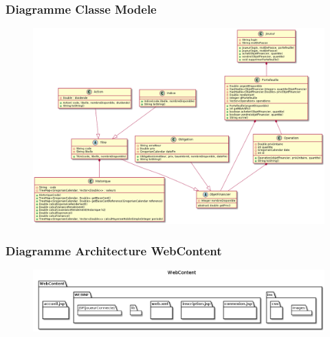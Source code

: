\begin{frame}
    \frametitle{Diagramme Classe Modele}
        \begin{figure}

    	\includegraphics[scale=0.20]{images/DiagrammeClasseFinalModele.png}
    	    	\end{figure}

\end{frame}

\begin{frame}
    \frametitle{Diagramme Architecture WebContent}

    \begin{figure}
    	\includegraphics[scale=0.25]{images/packagesWebContent.png}
    	    	\end{figure}

\end{frame}